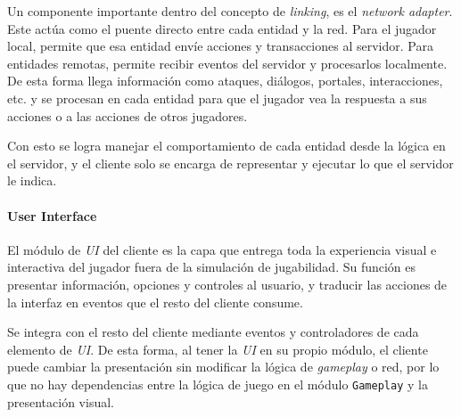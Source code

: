 Un componente importante dentro del concepto de \textit{linking}, es el \textit{network adapter}. Este actúa como 
el puente directo entre cada entidad y la red. Para el jugador local, permite que esa entidad envíe acciones y 
transacciones al servidor. Para entidades remotas, permite recibir eventos del servidor y procesarlos localmente.
De esta forma llega información como ataques, diálogos, portales, interacciones, etc. y se procesan en 
cada entidad para que el jugador vea la respuesta a sus acciones o a las acciones de otros jugadores.

Con esto se logra manejar el comportamiento de cada entidad desde la lógica en el servidor, 
y el cliente solo se encarga de representar y ejecutar lo que el servidor le indica.

\paragraph{User Interface}

El módulo de \textit{UI} del cliente es la capa que entrega toda la experiencia visual e interactiva del jugador 
fuera de la simulación de jugabilidad. Su función es presentar información, opciones y controles al 
usuario, y traducir las acciones de la interfaz en eventos que el resto del cliente consume.

Se integra con el resto del cliente mediante eventos y controladores de cada elemento de \textit{UI}. De esta forma, 
al tener la \textit{UI} en su propio módulo, el cliente puede cambiar la presentación sin modificar la lógica de 
\textit{gameplay} o red, por lo que no hay dependencias entre la lógica de juego en el módulo \texttt{Gameplay} 
y la presentación visual.

